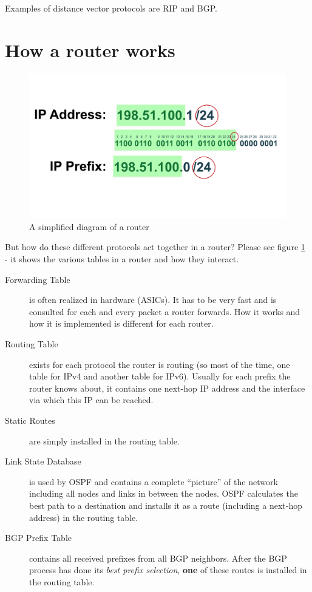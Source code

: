 Examples of distance vector protocols are \gls{RIP} and \gls{BGP}.

\section{How a router works}
\begin{figure}
  \centering
  \includegraphics[width=\linewidth,page=10]{img/Drawings.pdf}
  \caption{A simplified diagram of a router}
\label{fig:router}
\end{figure}
But how do these different protocols act together in a router? Please see figure \ref{fig:router} - it shows the various tables in a router and how they interact.

\begin{description}
  \item[Forwarding Table] is often realized in hardware (ASICs). It has to be very fast and is consulted for each and every packet a router forwards. How it works and how it is implemented is different for each router.
  \item[Routing Table] exists for each protocol the router is routing (so most of the time, one table for IPv4 and another table for IPv6). Usually for each prefix the router knows about, it contains one next-hop IP address and the interface via which this IP can be reached.
  \item[Static Routes] are simply installed in the routing table.
  \item[Link State Database] is used by OSPF and contains a complete ``picture'' of the network including all nodes and links in between the nodes. OSPF calculates the best path to a destination and installs it as a route (including a next-hop address) in the routing table.
  \item[BGP Prefix Table] contains all received prefixes from all BGP neighbors. After the BGP process has done its \emph{best prefix selection}, \textbf{one} of these routes is installed in the routing table.
\end{description}

